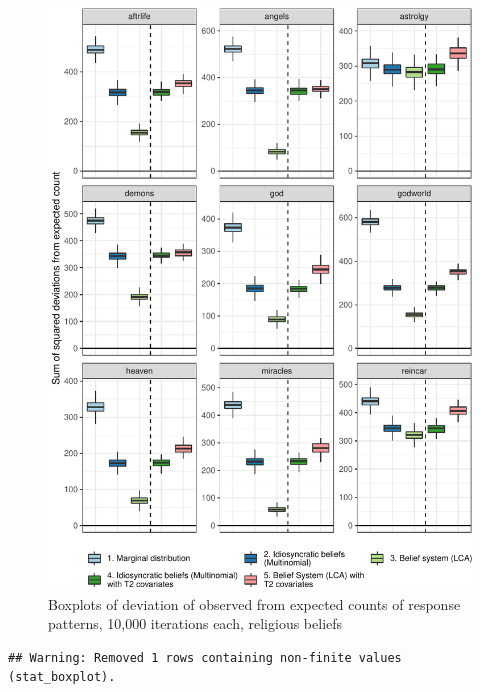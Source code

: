 \documentclass[12pt,]{article}
\begin{document}
\begin{figure}

{\centering \includegraphics{rethinking_constraint_revision_files/figure-latex/predictionerrorrel-1} 

}

\caption{Boxplots of deviation of observed from expected counts of response patterns, 10,000 iterations each, religious beliefs}\label{fig:predictionerrorrel}
\end{figure}

\begin{verbatim}
## Warning: Removed 1 rows containing non-finite values (stat_boxplot).
\end{verbatim}
\end{document}
